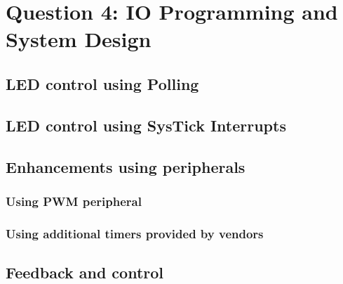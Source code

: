 \section*{Question 4: \small{IO Programming and System Design}}
\setcounter{section}{4}

\subsection{LED control using Polling}



\clearpage
\subsection{LED control using SysTick Interrupts}



\clearpage
\subsection{Enhancements using peripherals}

\subsubsection{Using PWM peripheral}



\clearpage
\subsubsection{Using additional timers provided by vendors}



\clearpage
\subsection{Feedback and control}


